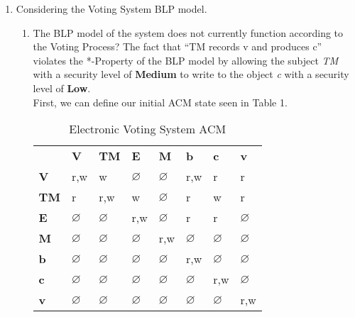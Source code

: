 \documentclass[journal,onecolumn]{IEEEtran}
\begin{document}
\begin{enumerate}
  \item Considering the Voting System BLP model. 
    \begin{enumerate}
      \item The BLP model of the system does not currently function according to the Voting Process? The fact that ``TM records v and produces c'' violates the *-Property of the BLP model by allowing the subject \textit{TM} with a security level of \textbf{Medium} to write to the object \textit{c} with a security level of \textbf{Low}. \\
      
      First, we can define our initial ACM state seen in Table 1.\\

      \begin{table}[]
        \centering
        \caption{Electronic Voting System ACM}
        \label{tab:initial-acm}
        \begin{tabular}{llllllll}
          & \textbf{V}    & \textbf{TM}   & \textbf{E}    & \textbf{M}    & \textbf{b}    & \textbf{c}               & \textbf{v}    \\
          \textbf{V}  & r,w           & w             & $\varnothing$ & $\varnothing$ & r,w           & r                        & r             \\
          \textbf{TM} & r             & r,w           & w             & $\varnothing$ & r             & {\color[HTML]{FE0000} w} & r             \\
          \textbf{E}  & $\varnothing$ & $\varnothing$ & r,w           & $\varnothing$ & r             & r                        & $\varnothing$ \\
          \textbf{M}  & $\varnothing$ & $\varnothing$ & $\varnothing$ & r,w           & $\varnothing$ & $\varnothing$            & $\varnothing$ \\
          \textbf{b}  & $\varnothing$ & $\varnothing$ & $\varnothing$ & $\varnothing$ & r,w           & $\varnothing$            & $\varnothing$ \\
          \textbf{c}  & $\varnothing$ & $\varnothing$ & $\varnothing$ & $\varnothing$ & $\varnothing$ & r,w                      & $\varnothing$ \\
          \textbf{v}  & $\varnothing$ & $\varnothing$ & $\varnothing$ & $\varnothing$ & $\varnothing$ & $\varnothing$            & r,w          
          \end{tabular}
        \end{table}
      

\end{enumerate}
\end{enumerate}
\end{document}
